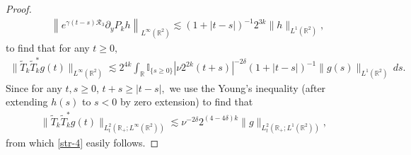 \documentclass[11pt,reqno]{article}
\numberwithin{equation}{section}
\newcommand\R{{\mathbb R}}
\begin{document}
\begin{appendices}
\begin{proof}
\begin{align*}
& \left\|e^{\gamma( t-s) \mathcal{R}_3} \partial_y {P_k} h\right\|_{L^{\infty}(\R^2)} \lesssim (1+|t-s|)^{-1}  2^{3 k}\|h\|_{L^{1}(\R^2)},
\end{align*}
to find that for any $t\geq 0,$
\begin{align*} 
\|\tilde{T}_k\tilde{T}_k^{*} g(t)\|_{L^{\infty}(\R^2)}\lesssim 2^{4k}  \int_{\mathbb{R}} \mathbb{I}_{\{s\geq 0\}} |\nu 2^{2k}(t+s)|^{-2\delta}(1+|t-s|)^{-1} \|g(s)\|_{L^1(\R^2)}\, d s .
\end{align*}
Since for any $t,s\geq 0$, $t+s\geq |t-s|,$ we use the Young's inequality (after extending $h(s)$ to $s<0$ by zero extension) to find that
 \begin{align*} 
\|\tilde{T}_k\tilde{T}_k^{*} g(t)\|_{L_t^2(\R_{+};L^{\infty}(\R^2))}\lesssim \nu^{-2\delta} 2^{(4-4\delta)k} \|g\|_{L_t^2(\R_{+};L^{1}(\R^2))},
\end{align*}
from which \eqref{str-4} easily follows.
\end{proof}


\end{appendices}
\end{document}
